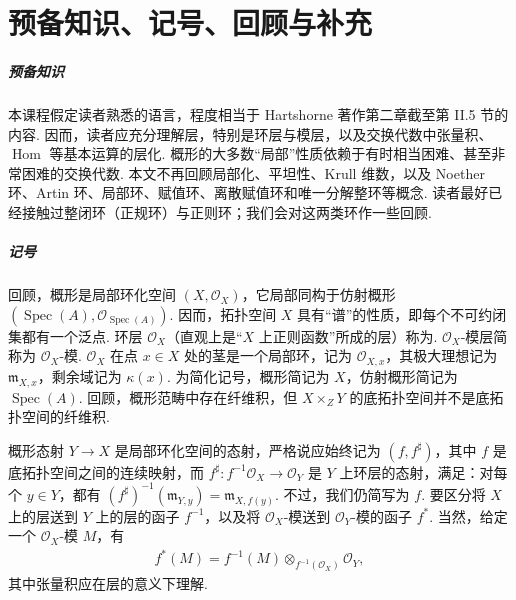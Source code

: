 \chapter*{预备知识、记号、回顾与补充}
\label{chap:ag-preliminaries}
\paragraph{预备知识}
本课程假定读者熟悉的语言，程度相当于 Hartshorne 著作第二章截至第 II.5 节的内容. 因而，读者应充分理解层，特别是环层与模层，以及交换代数中张量积、$\operatorname{Hom}$ 等基本运算的层化. 概形的大多数``局部''性质依赖于有时相当困难、甚至非常困难的交换代数. 本文不再回顾局部化、平坦性、Krull 维数，以及 Noether 环、Artin 环、局部环、赋值环、离散赋值环和唯一分解整环等概念. 读者最好已经接触过整闭环（正规环）与正则环；我们会对这两类环作一些回顾.
\paragraph{记号}
回顾，概形是局部环化空间 $(X,\mathcal O_X)$，它局部同构于仿射概形 $(\operatorname{Spec}(A),\mathcal O_{\operatorname{Spec}(A)})$. 因而，拓扑空间 $X$ 具有``谱''的性质，即每个不可约闭集都有一个泛点. 环层 $\mathcal O_X$（直观上是``$X$ 上正则函数''所成的层）称为. $\mathcal O_X$-模层简称为 $\mathcal O_X$-模. $\mathcal O_X$ 在点 $x\in X$ 处的茎是一个局部环，记为 $\mathcal O_{X,x}$，其极大理想记为 $\mathfrak m_{X,x}$，剩余域记为 $\kappa(x)$. 为简化记号，概形简记为 $X$，仿射概形简记为 $\operatorname{Spec}(A)$. 回顾，概形范畴中存在纤维积，但 $X\times_ZY$ 的底拓扑空间并不是底拓扑空间的纤维积.

概形态射 $Y\longrightarrow X$ 是局部环化空间的态射，严格说应始终记为 $(f,f^\sharp)$，其中 $f$ 是底拓扑空间之间的连续映射，而 $f^\sharp:f^{-1}\mathcal O_X\longrightarrow\mathcal O_Y$ 是 $Y$ 上环层的态射，满足：对每个 $y\in Y$，都有 $(f^\sharp)^{-1}(\mathfrak m_{Y,y})=\mathfrak m_{X,f(y)}$. 不过，我们仍简写为 $f$. 要区分将 $X$ 上的层送到 $Y$ 上的层的函子 $f^{-1}$，以及将 $\mathcal O_X$-模送到 $\mathcal O_Y$-模的函子 $f^*$. 当然，给定一个 $\mathcal O_X$-模 $M$，有
\begin{align*}
f^*(M)=f^{-1}(M)\otimes_{f^{-1}(\mathcal O_X)}\mathcal O_Y,
\end{align*}
其中张量积应在层的意义下理解.
